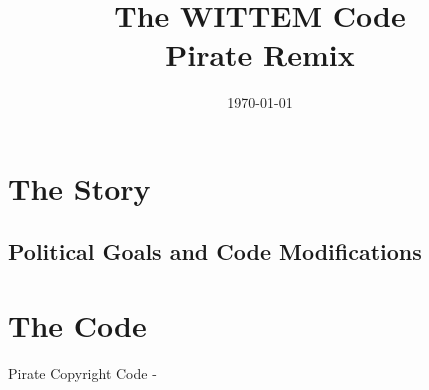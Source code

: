 



\title{The WITTEM Code\\\large Pirate Remix\\\vspace{4ex}\texttt{\WCPRVersion}}
\author{}
\date{\sffamily\today}





\cleardoublepage

\tableofcontents


\chapter{The Story}





\section{Political Goals and Code Modifications}





\chapter{The Code}
Pirate Copyright Code - \WCPRVersion













